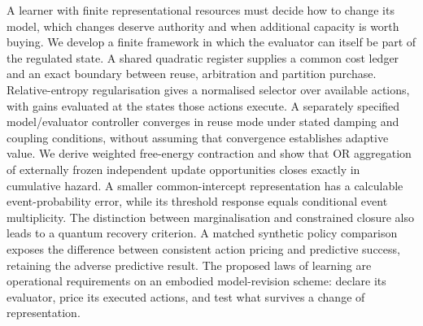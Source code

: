 A learner with finite representational resources must decide how to change its model, which changes deserve authority and when additional capacity is worth buying. We develop a finite framework in which the evaluator can itself be part of the regulated state. A shared quadratic register supplies a common cost ledger and an exact boundary between reuse, arbitration and partition purchase. Relative-entropy regularisation gives a normalised selector over available actions, with gains evaluated at the states those actions execute. A separately specified model/evaluator controller converges in reuse mode under stated damping and coupling conditions, without assuming that convergence establishes adaptive value. We derive weighted free-energy contraction and show that OR aggregation of externally frozen independent update opportunities closes exactly in cumulative hazard. A smaller common-intercept representation has a calculable event-probability error, while its threshold response equals conditional event multiplicity. The distinction between marginalisation and constrained closure also leads to a quantum recovery criterion. A matched synthetic policy comparison exposes the difference between consistent action pricing and predictive success, retaining the adverse predictive result. The proposed laws of learning are operational requirements on an embodied model-revision scheme: declare its evaluator, price its executed actions, and test what survives a change of representation.
